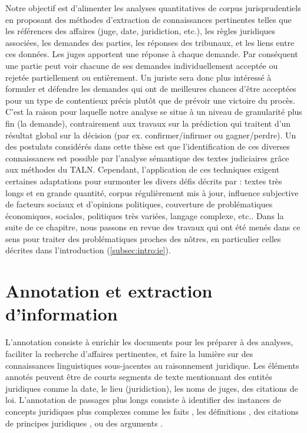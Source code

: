 Notre objectif est d'alimenter les analyses quantitatives de corpus jurisprudentiels en proposant des méthodes d'extraction de connaissances pertinentes telles que les références des affaires (juge, date, juridiction, etc.), les règles juridiques associées, les demandes des parties, les réponses des tribunaux, et les liens entre ces données. Les juges apportent une réponse à chaque demande. Par conséquent une partie peut voir chacune de ses demandes individuellement acceptée ou rejetée partiellement ou entièrement. Un juriste sera donc plus intéressé à formuler et défendre les demandes qui ont de meilleures chances d'être acceptées pour un type de contentieux précis plutôt que de prévoir une victoire du procès. C'est la raison pour laquelle notre analyse se situe à un niveau de granularité plus fin (la demande), contrairement aux travaux sur la prédiction qui traitent d'un résultat global sur la décision (par ex. confirmer/infirmer ou gagner/perdre).  Un des postulats considérés dans cette thèse est que l'identification de ces diverses connaissances est possible par l'analyse sémantique des textes judiciaires grâce aux méthodes du TALN. Cependant, l'application de ces techniques exigent certaines adaptations pour surmonter les divers défis décrits par \citet{narazenko2017legalnlpintro}: textes très longs et en grande quantité, corpus régulièrement mis à jour, influence subjective de facteurs sociaux et d'opinions politiques, couverture de problématiques économiques, sociales, politiques très variées, langage complexe, etc.. Dans la suite de ce chapitre, nous passons en revue des travaux qui ont été menés dans ce sens pour traiter des problématiques proches des nôtres, en particulier celles décrites dans l'introduction (\ref{subsec:intro:ie}). 

\section{Annotation et extraction d'information}

L'annotation consiste à enrichir les documents pour les préparer à des analyses, faciliter la recherche d'affaires pertinentes, et faire la lumière sur des connaissances linguistiques sous-jacentes au raisonnement juridique. Les éléments annotés peuvent être de courts segments de texte mentionnant des entités juridiques \citep{Waltl2016lexia, wyner2010extractlegalelts} comme la date, le lieu (juridiction), les noms de juges, des citations de loi.  L'annotation de passages plus longs consiste à identifier des instances de concepts juridiques plus complexes comme les faits \citep{wyner2010extractlegalelts, wyner2010casefactors, Shulayeva2017recognfactprincip}, les définitions \citep{Waltl2016lexia,waltl2017legaliegerman}, des citations de principes juridiques \citep{Shulayeva2017recognfactprincip}, ou des arguments \citep{WynerMoens2010mineargument}. 

